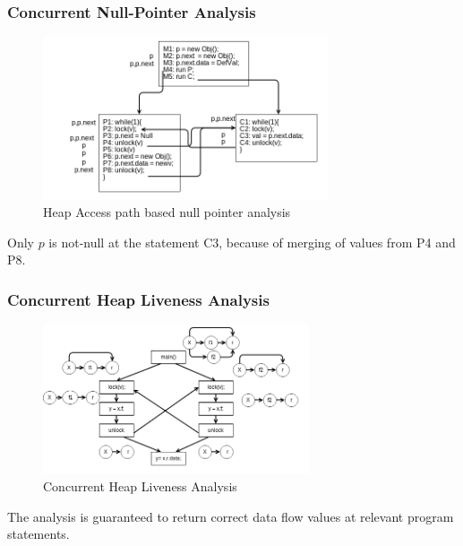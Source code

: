 \documentclass{beamer}
\begin{document}
\begin{frame}
\frametitle{Concurrent Null-Pointer Analysis}
	\begin{figure}
		\centering
		\includegraphics[width=0.75\textwidth]{Figures/concurrent_analysis_2.png}
		\caption{Heap Access path based null pointer analysis}
		\label{fig:nullpointeranalysis}
	\end{figure}
	
	Only $p$ is not-null at the statement C3, because of merging of values from P4 and P8.
	
\end{frame}

\begin{frame}
	\frametitle{Concurrent Heap Liveness Analysis}
	\begin{figure}
		\centering
		\includegraphics[width=0.7\textwidth]{Figures/concurrent_analysis_3.png}
		\caption{Concurrent Heap Liveness Analysis }
		\label{fig:nullpointeranalysis}
	\end{figure}
	The analysis is guaranteed to return correct data flow values at relevant program statements.
	 
\end{frame}
\end{document}
